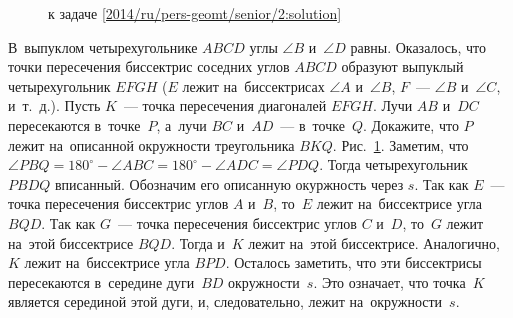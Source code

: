 \ifsolution
\begin{figure}\centering
    \caption{к задаче \ref{2014/ru/pers-geomt/senior/2:solution}}
    \label{2014/ru/pers-geomt/senior/2:solution:fig}
\end{figure}%
\fi %

\problem
В~выпуклом четырехугольнике $ABCD$ углы $\angle B$ и~$\angle D$ равны.
Оказалось, что точки пересечения биссектрис соседних углов $ABCD$ образуют
выпуклый четырехугольник $EFGH$
($E$ лежит на~биссектрисах $\angle A$ и~$\angle B$,
$F$~--- $\angle B$ и~$\angle C$, и~т.~д.).
Пусть $K$~--- точка пересечения диагоналей $EFGH$.
Лучи $AB$ и~$DC$ пересекаются в~точке~$P$, а~лучи $BC$ и~$AD$~--- в~точке~$Q$.
Докажите, что $P$ лежит на~описанной окружности треугольника $BKQ$.
\solution
\label{2014/ru/pers-geomt/senior/2:solution}%
Рис.~\ref{2014/ru/pers-geomt/senior/2:solution:fig}.
Заметим, что
$\angle PBQ = 180^\circ - \angle ABC = 180^\circ - \angle ADC = \angle PDQ$.
Тогда четырехугольник $PBDQ$ вписанный.
Обозначим его описанную окуржность через $s$.
Так как $E$~--- точка пересечения биссектрис углов $A$ и~$B$, то~$E$ лежит
на~биссектрисе угла $BQD$.
Так как $G$~--- точка пересечения биссектрис углов $C$ и~$D$, то~$G$ лежит
на~этой биссектрисе $BQD$.
Тогда и~$K$ лежит на~этой биссектрисе.
Аналогично, $K$ лежит на~биссектрисе угла $BPD$.
Осталось заметить, что эти биссектрисы пересекаются в~середине дуги~$BD$
окружности~$s$.
Это означает, что точка~$K$ является серединой этой дуги, и, следовательно,
лежит на~окружности~$s$.
\endproblem
